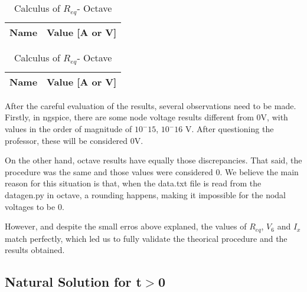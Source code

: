 \begin{table}[ht]
\parbox{.30\linewidth}{
  \centering
  \begin{tabular}{|l|r|}
    \hline    
    {\bf Name} & {\bf Value [A or V]} \\ \hline
    
  \end{tabular}
  \caption{Simulation and Calculus of Req (NgSpice)}} 
\parbox{.30\linewidth}{
  \centering
  \begin{tabular}{|l|r|}
    \hline    
    {\bf Name} & {\bf Value [A or V]} \\ \hline
    
  \end{tabular}
  \caption{Calculus of $R_{eq}$- Octave}}
 
\end{table}

\par After the careful evaluation of the results, several observations need to be made. Firstly, in ngspice, there are some node voltage results different from 0V, with  values  in the order of magnitude of $10^-15$, $10^-16$ V. After questioning the professor, these will be considered 0V.

\par On the other hand, octave results have equally those discrepancies. That said, the procedure was the same and those values were considered 0. We believe the main reason for this situation is that, when the data.txt file is read from the datagen.py in octave, a rounding happens, making it impossible for the nodal voltages to be 0. 

\par However, and despite the small erros above explaned, the values of $R_{eq}$, $V_{6}$ and $I_{x}$ match perfectly, which led us to fully validate the theorical procedure and the results obtained.





\subsection{Natural Solution for t$>$0}





















